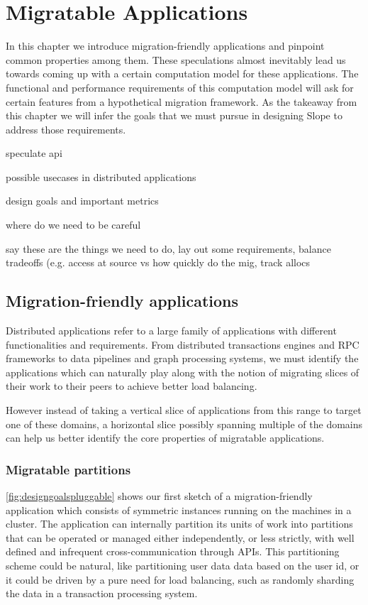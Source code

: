 \chapter{Migratable Applications}
\label{chap:migratableapps}

In this chapter we introduce migration-friendly applications and pinpoint
common properties among them. These speculations almost inevitably lead
us towards coming up with a certain computation model for these
applications.
The functional and performance requirements of this computation model will
ask for certain features from a hypothetical migration framework. As the
takeaway from this chapter we will infer the goals that we must pursue
in designing Slope to address those requirements.

speculate api

possible usecases in distributed applications

design goals and important metrics

where do we need to be careful

say these are the things we need to do, lay out some requirements,
balance tradeoffs (e.g. access at source vs how quickly do the mig,
track allocs

\section{Migration-friendly applications}
Distributed applications refer to a large family of applications with
different functionalities and requirements. From distributed transactions
engines and RPC frameworks to data pipelines and graph processing systems,
we must identify the
applications which can naturally play along with the notion of migrating
slices of their work to their peers to achieve better load balancing.

However instead of taking a vertical slice of applications from this range
to target one of these domains, a horizontal slice possibly spanning
multiple of the domains can help us better identify the core
properties of migratable applications.

\subsection{Migratable partitions}

\autoref{fig:designgoalspluggable} shows our first sketch of a
migration-friendly application which consists of symmetric instances
running on the machines in a cluster. The application can internally
partition its units of work into partitions that can be operated or
managed either independently, or less strictly,
with well defined and infrequent cross-communication through APIs.
This partitioning scheme could be natural, like
partitioning user data data based on the user id, or it could be driven
by a pure need for load balancing, such as randomly sharding the data
in a transaction processing system.


